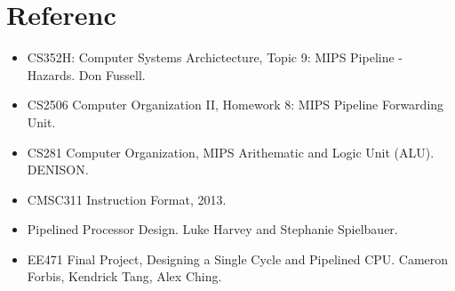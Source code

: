 \documentclass[11pt, a4paper]{article}
\begin{document}
\section{Referenc}
\begin{itemize}
	\item CS352H: Computer Systems Archictecture, Topic 9: MIPS Pipeline - Hazards. Don Fussell.
	\item CS2506 Computer Organization II, Homework 8: MIPS Pipeline Forwarding Unit.
	\item CS281 Computer Organization, MIPS Arithematic and Logic Unit (ALU). DENISON.
	\item CMSC311 Instruction Format, 2013. 
	\item Pipelined Processor Design. Luke Harvey and Stephanie Spielbauer.
	\item EE471 Final Project, Designing a Single Cycle and Pipelined CPU. Cameron Forbis, Kendrick Tang, Alex Ching.
\end{itemize}
\end{document}
